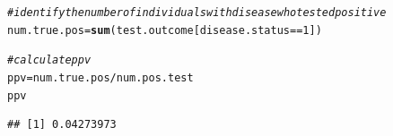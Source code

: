\documentclass{report}\usepackage[]{graphicx}\usepackage[]{color}
\makeatletter
\newcommand{\hlnum}[1]{\textcolor[rgb]{0.686,0.059,0.569}{#1}}%
\newcommand{\hlcom}[1]{\textcolor[rgb]{0.678,0.584,0.686}{\textit{#1}}}%
\newcommand{\hlopt}[1]{\textcolor[rgb]{0,0,0}{#1}}%
\newcommand{\hlstd}[1]{\textcolor[rgb]{0.345,0.345,0.345}{#1}}%
\newcommand{\hlkwb}[1]{\textcolor[rgb]{0.69,0.353,0.396}{#1}}%
\newcommand{\hlkwd}[1]{\textcolor[rgb]{0.737,0.353,0.396}{\textbf{#1}}}%
\newenvironment{kframe}{%
 \def\at@end@of@kframe{}%
 \ifinner\ifhmode%
  \def\at@end@of@kframe{\end{minipage}}%
  \begin{minipage}{\columnwidth}%
 \fi\fi%
 \def\FrameCommand##1{\hskip\@totalleftmargin \hskip-\fboxsep
 \colorbox{shadecolor}{##1}\hskip-\fboxsep
     \hskip-\linewidth \hskip-\@totalleftmargin \hskip\columnwidth}%
 \MakeFramed {\advance\hsize-\width
   \@totalleftmargin\z@ \linewidth\hsize
   \@setminipage}}%
 {\par\unskip\endMakeFramed%
 \at@end@of@kframe}
\newenvironment{knitrout}{}{} %
\makeatother
\begin{document}
\begin{knitrout}
\begin{kframe}
\begin{alltt}
\hlcom{# identify the number of individuals with disease who tested positive}
\hlstd{num.true.pos} \hlkwb{=} \hlkwd{sum}\hlstd{(test.outcome[disease.status} \hlopt{==} \hlnum{1}\hlstd{])}

\hlcom{# calculate ppv}
\hlstd{ppv} \hlkwb{=} \hlstd{num.true.pos} \hlopt{/} \hlstd{num.pos.test}
\hlstd{ppv}
\end{alltt}
\begin{verbatim}
## [1] 0.04273973
\end{verbatim}
\end{kframe}
\end{knitrout}





\end{document}
